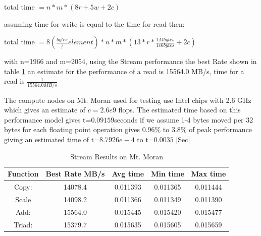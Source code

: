 \documentclass[]{article}%
\begin{document}
total time $=n*m*(8r+5w+2c)$

assuming time for write is equal to the time for read then:

total time $=8 (\frac{bytes}/{element})*n*m*(13*r*\frac{1Mbytes}{1e6 bytes} + 2c)$

with n=1966 and m=2054, using the Stream performance the best Rate shown in table \ref{table:STREAM} an estimate for the performance of a read is 15564.0 MB/s, time for a read is $\frac{1}{15564.0 MB/s}$


The compute nodes on Mt. Moran used for testing use Intel chips with 2.6 GHz which gives an estimate of $c=2.6e9$ flops. The estimated time based on this performance model gives t=$  0.09159 $seconds if we assume 1-4 bytes moved per 32 bytes for each floating point operation gives 0.96\% to 3.8\% of peak performance giving an estimated time  of t=$8.7926e-4$ to  t=$0.0035$ [Sec]

\begin{table}[ht]
\caption{Stream Results on Mt. Moran}
\centering
\begin{tabular}{c c  c c c}
\hline\hline
\hline
Function   & Best Rate MB/s & Avg time  &   Min time &    Max time \\ [0.5ex] 
\hline

Copy:    &     14078.4    & 0.011393    & 0.011365     & 0.011444\\
Scale     &  14098.2    & 0.011366     & 0.011349    & 0.011390\\
Add:      & 15564.0    & 0.015445     & 0.015420     & 0.015477\\
Triad:    & 15379.7    & 0.015635     & 0.015605     & 0.015659\\

\hline
\end{tabular}
\label{table:STREAM}
\end{table} 






\end{document}
